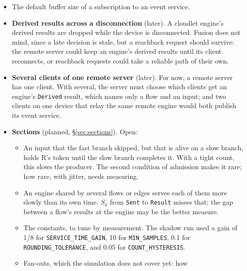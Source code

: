 \documentclass[11pt]{article}
\newcommand{\code}[1]{\texttt{#1}}
\begin{document}
\begin{itemize}[nosep]
        ticket deadline should cover the offer deadlines along the longest path
        of the flow. The compiler now computes both from the engines' timeouts
        (\S\ref{sec:install}). They are upper bounds: an input that is lost
        holds its token until then. Whether tighter bounds are worth it is
        open.
  \item The default buffer size of a subscription to an event service.
  \item \textbf{Derived results across a disconnection} (later). A cloudlet
        engine's derived results are dropped while the device is
        disconnected. Fusion does not mind, since a late decision is stale,
        but a reachback request should survive: the remote server could keep
        an engine's derived results until its client reconnects, or reachback
        requests could take a reliable path of their own.
  \item \textbf{Several clients of one remote server} (later). For now, a
        remote server has one client. With several, the server must choose
        which clients get an engine's \code{Derived} result, which names only
        a flow and an input; and two clients on one device that relay the
        same remote engine would both publish its event service.
  \item \textbf{Sections} (planned, \S\ref{sec:sections}). Open:
        \begin{itemize}[nosep]
          \item An input that the fast branch skipped, but that is alive on
                a slow branch, holds R's token until the slow branch
                completes it. With a tight count, this slows the producer.
                The second condition of admission makes it rare; how rare,
                with jitter, needs measuring.
          \item An engine shared by several flows or edges serves each of
                them more slowly than its own time. $S_k$ from \code{Sent} to
                \code{Result} misses that; the gap between a flow's results
                at the engine may be the better measure.
          \item The constants, to tune by measurement. The shadow run used
                a gain of 1/8 for \code{SERVICE\_TIME\_GAIN}, 10 for
                \code{MIN\_SAMPLES}, 0.1 for \code{ROUNDING\_TOLERANCE},
                and 0.05 for \code{COUNT\_HYSTERESIS}.
          \item Fan-outs, which the simulation does not cover yet: how

\end{itemize}
\end{itemize}
\end{document}
